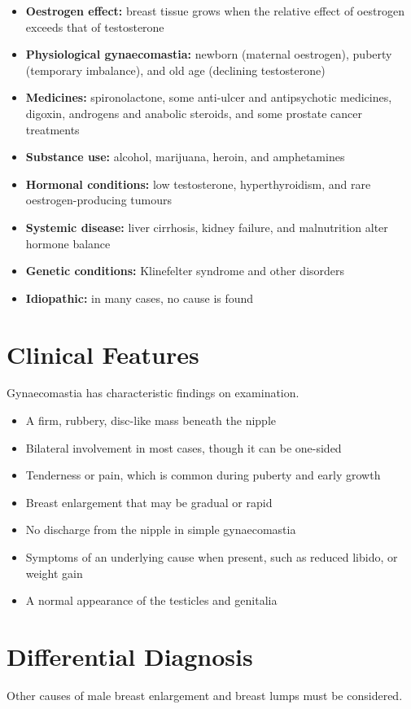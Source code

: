 \begin{itemize}
    \item \textbf{Oestrogen effect:} breast tissue grows when the relative effect of oestrogen exceeds that of testosterone
    \item \textbf{Physiological gynaecomastia:} newborn (maternal oestrogen), puberty (temporary imbalance), and old age (declining testosterone)
    \item \textbf{Medicines:} spironolactone, some anti-ulcer and antipsychotic medicines, digoxin, androgens and anabolic steroids, and some prostate cancer treatments
    \item \textbf{Substance use:} alcohol, marijuana, heroin, and amphetamines
    \item \textbf{Hormonal conditions:} low testosterone, hyperthyroidism, and rare oestrogen-producing tumours
    \item \textbf{Systemic disease:} liver cirrhosis, kidney failure, and malnutrition alter hormone balance
    \item \textbf{Genetic conditions:} Klinefelter syndrome and other disorders
    \item \textbf{Idiopathic:} in many cases, no cause is found
\end{itemize}

\section*{Clinical Features}
Gynaecomastia has characteristic findings on examination.

\begin{itemize}
    \item A firm, rubbery, disc-like mass beneath the nipple
    \item Bilateral involvement in most cases, though it can be one-sided
    \item Tenderness or pain, which is common during puberty and early growth
    \item Breast enlargement that may be gradual or rapid
    \item No discharge from the nipple in simple gynaecomastia
    \item Symptoms of an underlying cause when present, such as reduced libido, or weight gain
    \item A normal appearance of the testicles and genitalia
\end{itemize}

\section*{Differential Diagnosis}
Other causes of male breast enlargement and breast lumps must be considered.

